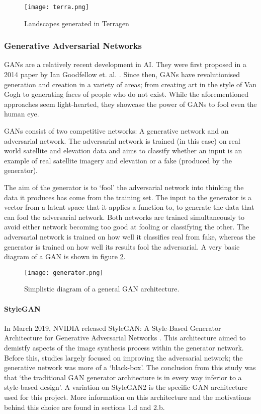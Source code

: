 \documentclass[a4paper]{report}
\begin{document}
\begin{figure}[H]
    \centering
        \texttt{[image: terra.png]}
        \caption{Landscapes generated in Terragen}
        \label{fig:terra}
\end{figure}

\subsubsection{Generative Adversarial Networks}
GANs are a relatively recent development in AI. They were first proposed in a 2014 paper by Ian Goodfellow et. al. \cite{goodfellow2014generative}. Since then, GANs have revolutionised generation and creation in a variety of areas; from creating art in the style of Van Gogh \cite{gangogh} to generating faces of people who do not exist\cite{persondoesnotexist}. While the aforementioned approaches seem light-hearted, they showcase the power of GANs to fool even the human eye.

GANs consist of two competitive networks: A generative network and an adversarial network. The adversarial network is trained (in this case) on real world satellite and elevation data and aims to classify whether an input is an example of real satellite imagery and elevation or a fake (produced by the generator).

The aim of the generator is to `fool' the adversarial network into thinking the data it produces has come from the training set. The input to the generator is a vector from a latent space that it applies a function to, to generate the data that can fool the adversarial network. Both networks are trained simultaneously to avoid either network becoming too good at fooling or classifying the other. The adversarial network is trained on how well it classifies real from fake, whereas the generator is trained on how well its results fool the adversarial. A very basic diagram of a GAN is shown in figure \ref{fig:gan}.

\begin{figure}[H]
    \centering
        \texttt{[image: generator.png]}
        \caption{Simplistic diagram of a general GAN architecture.}
        \label{fig:gan}
\end{figure}

\paragraph{StyleGAN}
In March 2019, NVIDIA released StyleGAN: A Style-Based Generator Architecture for Generative Adversarial Networks \cite{stylegan}. This architecture aimed to demistfy aspects of the image synthesis process within the generator network. Before this, studies largely focused on improving the adversarial network; the generative network was more of a `black-box'. The conclusion from this study was that `the traditional GAN generator architecture is in every way inferior to a style-based design'. A variation on StyleGAN2 \cite{stylegan2} is the specific GAN architecture used for this project. More information on this architecture and the motivations behind this choice are found in sections 1.d and 2.b.
\end{document}
